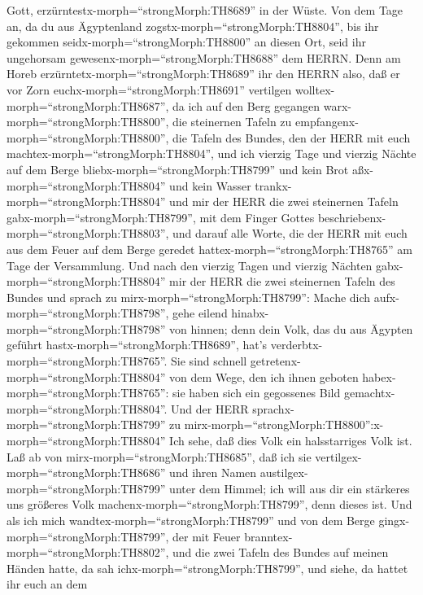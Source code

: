 Gott, erzürntestx-morph=``strongMorph:TH8689'' in der Wüste. Von dem
Tage an, da du aus Ägyptenland zogstx-morph=``strongMorph:TH8804'', bis
ihr gekommen seidx-morph=``strongMorph:TH8800'' an diesen Ort, seid ihr
ungehorsam gewesenx-morph=``strongMorph:TH8688'' dem HERRN. 
Denn am Horeb erzürntetx-morph=``strongMorph:TH8689'' ihr den HERRN
also, daß er vor Zorn euchx-morph=``strongMorph:TH8691'' vertilgen
wolltex-morph=``strongMorph:TH8687'',  da ich auf den Berg
gegangen warx-morph=``strongMorph:TH8800'', die steinernen Tafeln zu
empfangenx-morph=``strongMorph:TH8800'', die Tafeln des Bundes, den der
HERR mit euch machtex-morph=``strongMorph:TH8804'', und ich vierzig Tage
und vierzig Nächte auf dem Berge bliebx-morph=``strongMorph:TH8799'' und
kein Brot aßx-morph=``strongMorph:TH8804'' und kein Wasser
trankx-morph=``strongMorph:TH8804''  und mir der HERR die
zwei steinernen Tafeln gabx-morph=``strongMorph:TH8799'', mit dem Finger
Gottes beschriebenx-morph=``strongMorph:TH8803'', und darauf alle Worte,
die der HERR mit euch aus dem Feuer auf dem Berge geredet
hattex-morph=``strongMorph:TH8765'' am Tage der Versammlung.
 Und nach den vierzig Tagen und vierzig Nächten
gabx-morph=``strongMorph:TH8804'' mir der HERR die zwei steinernen
Tafeln des Bundes  und sprach zu
mirx-morph=``strongMorph:TH8799'': Mache dich
aufx-morph=``strongMorph:TH8798'', gehe eilend
hinabx-morph=``strongMorph:TH8798'' von hinnen; denn dein Volk, das du
aus Ägypten geführt hastx-morph=``strongMorph:TH8689'', hat's
verderbtx-morph=``strongMorph:TH8765''. Sie sind schnell
getretenx-morph=``strongMorph:TH8804'' von dem Wege, den ich ihnen
geboten habex-morph=``strongMorph:TH8765'': sie haben sich ein
gegossenes Bild gemachtx-morph=``strongMorph:TH8804''.  Und
der HERR sprachx-morph=``strongMorph:TH8799'' zu
mirx-morph=``strongMorph:TH8800'':x-morph=``strongMorph:TH8804'' Ich
sehe, daß dies Volk ein halsstarriges Volk ist.  Laß ab von
mirx-morph=``strongMorph:TH8685'', daß ich sie
vertilgex-morph=``strongMorph:TH8686'' und ihren Namen
austilgex-morph=``strongMorph:TH8799'' unter dem Himmel; ich will aus
dir ein stärkeres uns größeres Volk
machenx-morph=``strongMorph:TH8799'', denn dieses ist.  Und
als ich mich wandtex-morph=``strongMorph:TH8799'' und von dem Berge
gingx-morph=``strongMorph:TH8799'', der mit Feuer
branntex-morph=``strongMorph:TH8802'', und die zwei Tafeln des Bundes
auf meinen Händen hatte,  da sah
ichx-morph=``strongMorph:TH8799'', und siehe, da hattet ihr euch an dem

